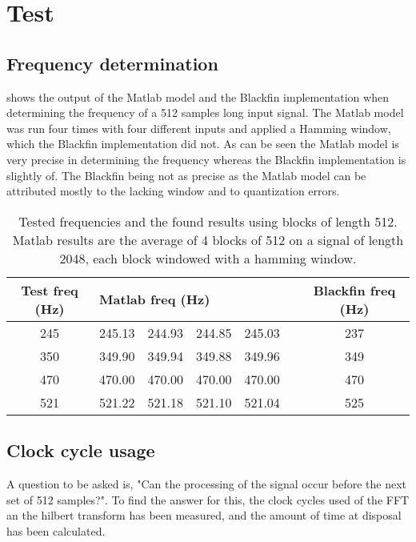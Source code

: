 
\section{Test}
\label{sec:test}
\subsection{Frequency determination}
 shows the output of the Matlab model and the Blackfin implementation when determining the frequency of a \num{512} samples long input signal.
The Matlab model was run four times with four different inputs and applied a Hamming window, which the Blackfin implementation did not.
As can be seen the Matlab model is very precise in determining the frequency whereas the Blackfin implementation is slightly of.
The Blackfin being not as precise as the Matlab model can be attributed mostly to the lacking window and to quantization errors.

\begin{table}
	\centering
	\begin{tabular}{c | c c c c c | c}
		\toprule
		Test freq (Hz) & \multicolumn{4}{l}{Matlab freq (Hz)} & & Blackfin freq (Hz) \\
		\midrule
		\num{245} & \num{245.13} & \num{244.93} & \num{244.85} & \num{245.03} && \num{237}\\
		\num{350} & \num{349.90} & \num{349.94} & \num{349.88} & \num{349.96} && \num{349}\\
		\num{470} & \num{470.00} & \num{470.00} & \num{470.00} & \num{470.00} && \num{470} \\
		\num{521} & \num{521.22} & \num{521.18} & \num{521.10} & \num{521.04} && \num{525} \\
		\bottomrule
	\end{tabular}
	\caption{Tested frequencies and the found results using blocks of length \num{512}. Matlab results are the average of 4 blocks of \num{512} on a signal of length \num{2048}, each block windowed with a hamming window.}
	\label{tab:test}
\end{table}

\subsection{Clock cycle usage}
A question to be asked is, "Can the processing of the signal occur before the next set of 512 samples?".
To find the answer for this, the clock cycles used of the FFT an the hilbert transform has been measured, and the amount of time at disposal has been calculated.

